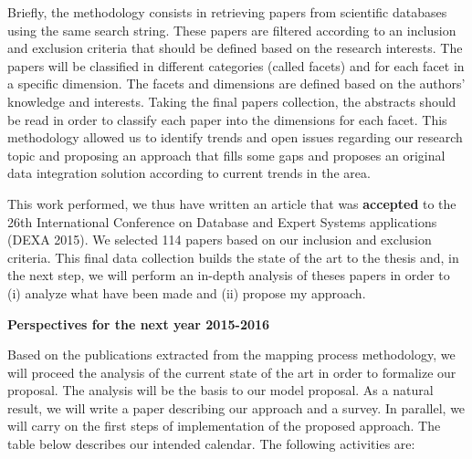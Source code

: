 \documentclass[12pt,a4paper,oneside]{report}
\begin{document}
Briefly, the methodology consists in retrieving papers from scientific databases using the same search string. These papers are filtered according to an inclusion and exclusion criteria that should be defined based on the research interests. The papers will be classified in different categories (called facets) and for each facet in a specific dimension. The facets and dimensions are defined based on the authors’ knowledge and interests. Taking the final papers collection, the abstracts should be read in order to classify each paper into the dimensions for each facet. 
This methodology allowed us to identify trends and open issues regarding our research topic and proposing an approach that fills some gaps and proposes an original data integration solution according to current trends in the area.

This work performed, we thus have written an article that was \textbf{accepted} to the 26th International Conference on Database and Expert Systems applications (DEXA 2015).
We selected 114 papers based on our inclusion and exclusion criteria. This final data collection builds the state of the art to the thesis and, in the next step, we will perform an in-depth analysis of theses papers in order to (i) analyze what have been made and (ii) propose my approach.  

\begin{flushleft}
\textbf{Perspectives for the next year 2015-2016}\\
\end{flushleft}
Based on the publications extracted from the mapping process methodology, we will proceed the analysis of the current state of the art in order to formalize our proposal. The analysis will be the basis to our model proposal. As a natural result, we will write a paper describing our approach and a survey. In parallel, we will carry on the first steps of implementation of the proposed approach.
The table below describes our intended calendar. The following activities are:
\end{document}
